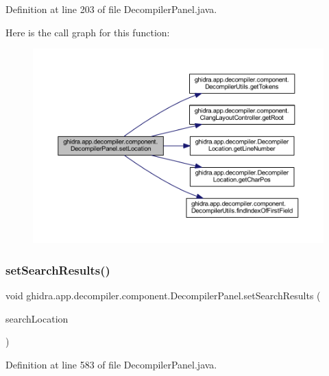Definition at line 203 of file Decompiler\+Panel.\+java.

Here is the call graph for this function\+:
\nopagebreak
\begin{figure}[H]
\begin{center}
\leavevmode
\includegraphics[width=350pt]{classghidra_1_1app_1_1decompiler_1_1component_1_1_decompiler_panel_aa7d5c96f468ed45383b4a6c1e52d57c0_cgraph}
\end{center}
\end{figure}
\mbox{\label{classghidra_1_1app_1_1decompiler_1_1component_1_1_decompiler_panel_aa4d1b7d9352119a5d3173cb498a4e078}} 
\subsubsection{\texorpdfstring{setSearchResults()}{setSearchResults()}}
{\footnotesize\ttfamily void ghidra.\+app.\+decompiler.\+component.\+Decompiler\+Panel.\+set\+Search\+Results (\begin{DoxyParamCaption}\item[{Search\+Location}]{search\+Location }\end{DoxyParamCaption})\hspace{0.3cm}{\ttfamily [inline]}}



Definition at line 583 of file Decompiler\+Panel.\+java.

